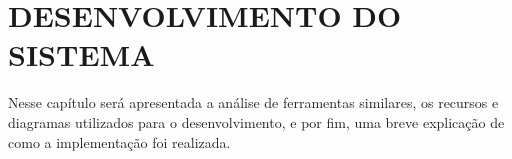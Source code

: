 \chapter{DESENVOLVIMENTO DO SISTEMA}
\label{chap:desenvolvimento}

Nesse capítulo será apresentada a análise de ferramentas similares, os recursos e diagramas utilizados para o desenvolvimento, e por fim, uma breve explicação de como a implementação foi realizada.





